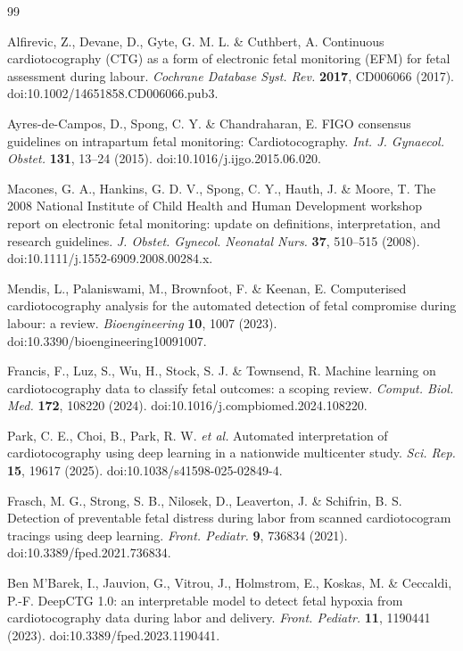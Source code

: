 \documentclass[pdflatex,sn-nature]{sn-jnl}
\begin{document}
\begin{thebibliography}{99}

Alfirevic, Z., Devane, D., Gyte, G. M. L. \& Cuthbert, A.
Continuous cardiotocography (CTG) as a form of electronic fetal monitoring (EFM) for fetal assessment during labour.
\textit{Cochrane Database Syst. Rev.} \textbf{2017}, CD006066 (2017).
doi:10.1002/14651858.CD006066.pub3.

Ayres-de-Campos, D., Spong, C. Y. \& Chandraharan, E.
FIGO consensus guidelines on intrapartum fetal monitoring: Cardiotocography.
\textit{Int. J. Gynaecol. Obstet.} \textbf{131}, 13--24 (2015).
doi:10.1016/j.ijgo.2015.06.020.

Macones, G. A., Hankins, G. D. V., Spong, C. Y., Hauth, J. \& Moore, T.
The 2008 National Institute of Child Health and Human Development workshop report on electronic fetal monitoring: update on definitions, interpretation, and research guidelines.
\textit{J. Obstet. Gynecol. Neonatal Nurs.} \textbf{37}, 510--515 (2008).
doi:10.1111/j.1552-6909.2008.00284.x.

Mendis, L., Palaniswami, M., Brownfoot, F. \& Keenan, E.
Computerised cardiotocography analysis for the automated detection of fetal compromise during labour: a review.
\textit{Bioengineering} \textbf{10}, 1007 (2023).
doi:10.3390/bioengineering10091007.

Francis, F., Luz, S., Wu, H., Stock, S. J. \& Townsend, R.
Machine learning on cardiotocography data to classify fetal outcomes: a scoping review.
\textit{Comput. Biol. Med.} \textbf{172}, 108220 (2024).
doi:10.1016/j.compbiomed.2024.108220.

Park, C. E., Choi, B., Park, R. W. \textit{et al.}
Automated interpretation of cardiotocography using deep learning in a nationwide multicenter study.
\textit{Sci. Rep.} \textbf{15}, 19617 (2025).
doi:10.1038/s41598-025-02849-4.

Frasch, M. G., Strong, S. B., Nilosek, D., Leaverton, J. \& Schifrin, B. S.
Detection of preventable fetal distress during labor from scanned cardiotocogram tracings using deep learning.
\textit{Front. Pediatr.} \textbf{9}, 736834 (2021).
doi:10.3389/fped.2021.736834.

Ben M'Barek, I., Jauvion, G., Vitrou, J., Holmstrom, E., Koskas, M. \& Ceccaldi, P.-F.
DeepCTG 1.0: an interpretable model to detect fetal hypoxia from cardiotocography data during labor and delivery.
\textit{Front. Pediatr.} \textbf{11}, 1190441 (2023).
doi:10.3389/fped.2023.1190441.


\end{thebibliography}
\end{document}
